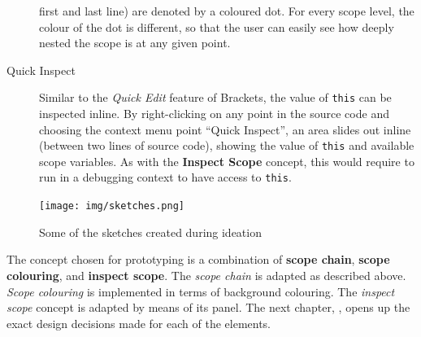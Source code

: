 \begin{description}
first and last line) are denoted by a coloured dot. For every scope
level, the colour of the dot is different, so that the user can easily
see how deeply nested the scope is at any given point.
\item[Quick Inspect]
Similar to the \emph{Quick Edit} feature of Brackets, the value of
\texttt{this} can be inspected inline. By right-clicking on any point in
the source code and choosing the context menu point “Quick Inspect”, an
area slides out inline (between two lines of source code), showing the
value of \texttt{this} and available scope variables. As with the
\textbf{Inspect Scope} concept, this would require to run in a debugging
context to have access to \texttt{this}.
\end{description}

\begin{figure}[htbp]
\centering
\texttt{[image: img/sketches.png]}
\caption{Some of the sketches created during ideation}
\label{fig:sketches1}
\end{figure}

The concept chosen for prototyping is a combination of \textbf{scope
chain}, \textbf{scope colouring}, and \textbf{inspect scope}. The
\emph{scope chain} is adapted as described above. \emph{Scope colouring}
is implemented in terms of background colouring. The \emph{inspect
scope} concept is adapted by means of its panel. The next chapter,
, opens up the exact design decisions made for each of
the elements.

